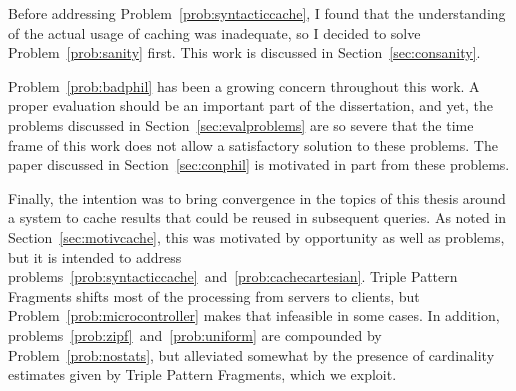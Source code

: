 Before addressing Problem~\ref{prob:syntacticcache}, I found that the
understanding of the actual usage of caching was inadequate, so I
decided to solve Problem~\ref{prob:sanity} first. This work is
discussed in Section~\ref{sec:consanity}.

Problem~\ref{prob:badphil} has been a growing concern throughout this
work. A proper evaluation should be an important part of the
dissertation, and yet, the problems discussed in
Section~\ref{sec:evalproblems} are so severe that the time frame of
this work does not allow a satisfactory solution to these
problems. The paper discussed in Section~\ref{sec:conphil} is
motivated in part from these problems.

Finally, the intention was to bring convergence in the topics of this
thesis around a system to cache results that could be reused in
subsequent queries. As noted in Section~\ref{sec:motivcache}, this was
motivated by opportunity as well as problems, but it is intended to
address
problems~\ref{prob:syntacticcache}~and~\ref{prob:cachecartesian}.
Triple Pattern Fragments shifts most of the processing from servers to
clients, but Problem~\ref{prob:microcontroller} makes that infeasible
in some cases.  In addition,
problems~\ref{prob:zipf}~and~\ref{prob:uniform} are compounded by
Problem~\ref{prob:nostats}, but alleviated somewhat by the presence of
cardinality estimates given by Triple Pattern Fragments, which we
exploit.


